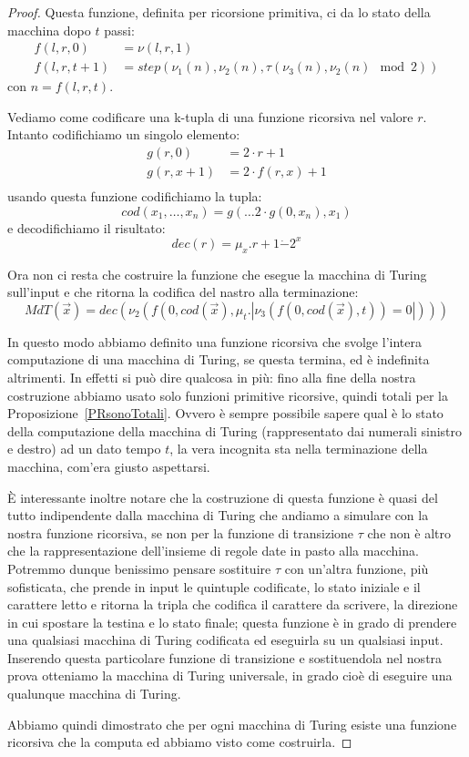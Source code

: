 \begin{proof}
Questa funzione, definita per ricorsione primitiva, ci da lo stato
della macchina dopo $t$ passi:
\begin{align*}
f(l,r,0) &= \nu(l,r,1)\\
f(l,r,t+1) &= step(\nu_1(n), \nu_2(n), \tau(\nu_3(n), \nu_2(n) \mod 2) )
\end{align*}
con $n = f(l,r,t)$.

Vediamo come codificare una k-tupla di una funzione ricorsiva nel valore $r$.
Intanto codifichiamo un singolo elemento:
\begin{align*}
g(r,0) &= 2\cdot r + 1\\ 
g(r,x+1) &= 2\cdot f(r, x) + 1\\
\end{align*}
usando questa funzione codifichiamo la tupla:
$$cod(x_1, \dots, x_n) = g(\dots 2\cdot g(0, x_n), x_1)$$
e decodifichiamo il risultato:
$$dec(r) = \mu_x.r+1\dot{-}2^x$$

Ora non ci resta che costruire la funzione che esegue la macchina di
Turing sull'input e che ritorna la codifica del nastro alla
terminazione: $$MdT(\vec{x}) = dec(\nu_2(f(0,cod(\vec{x}),\mu_t .
|\nu_3(f(0,cod(\vec{x}),t)) = 0|)))$$

In questo modo abbiamo definito una funzione ricorsiva che svolge
l'intera computazione di una macchina di Turing, se questa termina, ed
è indefinita altrimenti. In effetti si può dire qualcosa in più: fino
alla fine della nostra costruzione abbiamo usato solo funzioni
primitive ricorsive, quindi totali per la
Proposizione~\ref{PRsonoTotali}. Ovvero è sempre possibile sapere qual
è lo stato della computazione della macchina di Turing (rappresentato
dai numerali sinistro e destro) ad un dato tempo $t$, la vera
incognita sta nella terminazione della macchina, com'era giusto
aspettarsi.

È interessante inoltre notare che la costruzione di questa funzione è
quasi del tutto indipendente dalla macchina di Turing che andiamo a
simulare con la nostra funzione ricorsiva, se non per la funzione di
transizione $\tau$ che non è altro che la rappresentazione
dell'insieme di regole date in pasto alla macchina. Potremmo dunque
benissimo pensare sostituire $\tau$ con un'altra funzione, più
sofisticata, che prende in input le quintuple codificate, lo stato
iniziale e il carattere letto e ritorna la tripla che codifica il
carattere da scrivere, la direzione in cui spostare la testina e lo
stato finale; questa funzione è in grado di prendere una qualsiasi
macchina di Turing codificata ed eseguirla su un qualsiasi
input. Inserendo questa particolare funzione di transizione e
sostituendola nel nostra prova otteniamo la macchina di Turing
universale, in grado cioè di eseguire una qualunque macchina di
Turing.

Abbiamo quindi dimostrato che per ogni macchina di Turing esiste una
funzione ricorsiva che la computa ed abbiamo visto come costruirla.
\end{proof}


